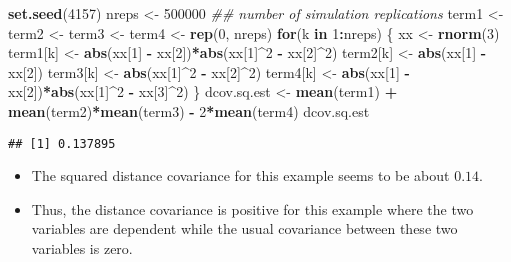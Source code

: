 \documentclass[]{book}
\newenvironment{Shaded}{\begin{snugshade}}{\end{snugshade}}
\newcommand{\CommentTok}[1]{\textcolor[rgb]{0.56,0.35,0.01}{\textit{#1}}}
\newcommand{\ControlFlowTok}[1]{\textcolor[rgb]{0.13,0.29,0.53}{\textbf{#1}}}
\newcommand{\DecValTok}[1]{\textcolor[rgb]{0.00,0.00,0.81}{#1}}
\newcommand{\KeywordTok}[1]{\textcolor[rgb]{0.13,0.29,0.53}{\textbf{#1}}}
\newcommand{\NormalTok}[1]{#1}
\newcommand{\OperatorTok}[1]{\textcolor[rgb]{0.81,0.36,0.00}{\textbf{#1}}}
\newcommand{\StringTok}[1]{\textcolor[rgb]{0.31,0.60,0.02}{#1}}
\begin{document}
\begin{Shaded}
\begin{Highlighting}[]
\KeywordTok{set.seed}\NormalTok{(}\DecValTok{4157}\NormalTok{)}
\NormalTok{nreps <-}\StringTok{ }\DecValTok{500000} \CommentTok{## number of simulation replications}
\NormalTok{term1 <-}\StringTok{ }\NormalTok{term2 <-}\StringTok{ }\NormalTok{term3 <-}\StringTok{ }\NormalTok{term4 <-}\StringTok{ }\KeywordTok{rep}\NormalTok{(}\DecValTok{0}\NormalTok{, nreps)}
\ControlFlowTok{for}\NormalTok{(k }\ControlFlowTok{in} \DecValTok{1}\OperatorTok{:}\NormalTok{nreps) \{}
\NormalTok{    xx <-}\StringTok{ }\KeywordTok{rnorm}\NormalTok{(}\DecValTok{3}\NormalTok{)}
\NormalTok{    term1[k] <-}\StringTok{ }\KeywordTok{abs}\NormalTok{(xx[}\DecValTok{1}\NormalTok{] }\OperatorTok{-}\StringTok{ }\NormalTok{xx[}\DecValTok{2}\NormalTok{])}\OperatorTok{*}\KeywordTok{abs}\NormalTok{(xx[}\DecValTok{1}\NormalTok{]}\OperatorTok{^}\DecValTok{2} \OperatorTok{-}\StringTok{ }\NormalTok{xx[}\DecValTok{2}\NormalTok{]}\OperatorTok{^}\DecValTok{2}\NormalTok{) }
\NormalTok{    term2[k] <-}\StringTok{ }\KeywordTok{abs}\NormalTok{(xx[}\DecValTok{1}\NormalTok{] }\OperatorTok{-}\StringTok{ }\NormalTok{xx[}\DecValTok{2}\NormalTok{])}
\NormalTok{    term3[k] <-}\StringTok{ }\KeywordTok{abs}\NormalTok{(xx[}\DecValTok{1}\NormalTok{]}\OperatorTok{^}\DecValTok{2} \OperatorTok{-}\StringTok{ }\NormalTok{xx[}\DecValTok{2}\NormalTok{]}\OperatorTok{^}\DecValTok{2}\NormalTok{)}
\NormalTok{    term4[k] <-}\StringTok{ }\KeywordTok{abs}\NormalTok{(xx[}\DecValTok{1}\NormalTok{] }\OperatorTok{-}\StringTok{ }\NormalTok{xx[}\DecValTok{2}\NormalTok{])}\OperatorTok{*}\KeywordTok{abs}\NormalTok{(xx[}\DecValTok{1}\NormalTok{]}\OperatorTok{^}\DecValTok{2} \OperatorTok{-}\StringTok{ }\NormalTok{xx[}\DecValTok{3}\NormalTok{]}\OperatorTok{^}\DecValTok{2}\NormalTok{)}
\NormalTok{\}}
\NormalTok{dcov.sq.est <-}\StringTok{ }\KeywordTok{mean}\NormalTok{(term1) }\OperatorTok{+}\StringTok{ }\KeywordTok{mean}\NormalTok{(term2)}\OperatorTok{*}\KeywordTok{mean}\NormalTok{(term3) }\OperatorTok{-}\StringTok{ }\DecValTok{2}\OperatorTok{*}\KeywordTok{mean}\NormalTok{(term4)}
\NormalTok{dcov.sq.est}
\end{Highlighting}
\end{Shaded}

\begin{verbatim}
## [1] 0.137895
\end{verbatim}

\begin{itemize}
\item
  The squared distance covariance for this example seems to be about \(0.14\).
\item
  Thus, the distance covariance is positive for this example where
  the two variables are dependent while the usual covariance between
  these two variables is zero.
\end{itemize}
\end{document}
